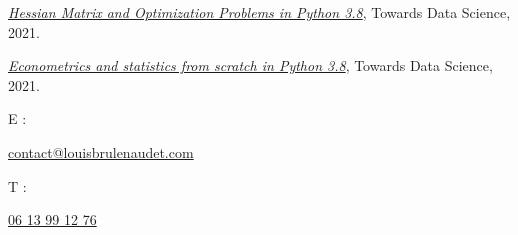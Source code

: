 \documentclass[french, 12pt]{article}
\begin{document}
\href{https://towardsdatascience.com/hessian-matrix-and-optimization-problems-in-python-3-8-f7cd2a615371}{\emph{Hessian Matrix and Optimization Problems in Python 3.8}}, Towards Data Science, 2021.\vspace{0.8cm}

\href{https://towardsdatascience.com/econometrics-and-statistics-from-scratch-in-python-3-8-linear-regression-mean-squared-error-9b81b8b84754}{\emph{Econometrics and statistics from scratch in Python 3.8}}, Towards Data Science, 2021.

\vspace{1.5cm}
\begin{center}
\small{\begin{ralewaysemibold}{E :}\end{ralewaysemibold} \ralewayLight \href{mailto:contact@louisbrulenaudet.com}{contact@louisbrulenaudet.com}}\hspace{2cm}
\small{\begin{ralewaysemibold}{T :}\end{ralewaysemibold} \ralewayLight\href{tel:0613991276}{06 13 99 12 76}}
\end{center}
\end{document}
